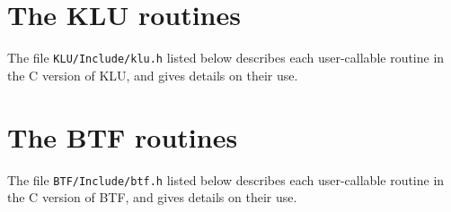 \documentclass[11pt]{article}
\begin{document}
\newpage
\section{The KLU routines}
\label{klu_include}

The file {\tt KLU/Include/klu.h} listed below describes each user-callable
routine in the C version of KLU, and gives details on their use.

{\footnotesize

}

\newpage
\section{The BTF routines}
\label{btf_include}

The file {\tt BTF/Include/btf.h} listed below describes each user-callable
routine in the C version of BTF, and gives details on their use.

{\footnotesize

}

\newpage



\end{document}
